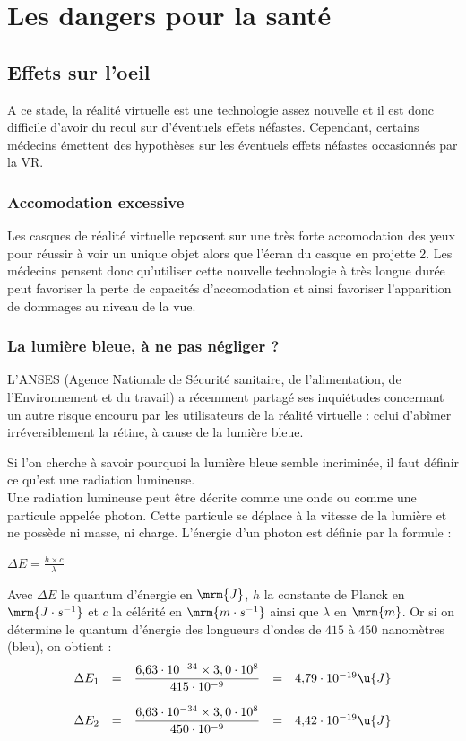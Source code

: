 \documentclass[12pt, a4paper]{report}
\begin{document}
\chapter[Dangers]{Les dangers pour la santé}

\section{Effets sur l'oeil}

A ce stade, la réalité virtuelle est une technologie assez nouvelle et il est donc difficile d'avoir du recul sur d'éventuels effets néfastes. Cependant, certains médecins émettent des hypothèses sur les éventuels effets néfastes occasionnés par la VR.

\subsection{Accomodation excessive} Les casques de réalité virtuelle reposent sur une très forte accomodation des yeux pour réussir à voir un unique objet alors que l'écran du casque en projette 2. Les médecins pensent donc qu'utiliser cette nouvelle technologie à très longue durée peut favoriser la perte de capacités d'accomodation et ainsi favoriser l'apparition de dommages au niveau de la vue.

\subsection{La lumière bleue, à ne pas négliger ?}

L'ANSES (Agence Nationale de Sécurité sanitaire, de l'alimentation, de l'Environnement et du travail) a récemment partagé ses inquiétudes concernant un autre risque encouru par les utilisateurs de la réalité virtuelle : celui d'abîmer irréversiblement la rétine, à cause de la lumière bleue.

Si l'on cherche à savoir pourquoi la lumière bleue semble incriminée, il faut définir ce qu'est une radiation lumineuse. \\ Une radiation lumineuse peut être décrite comme une onde ou comme une particule appelée photon. Cette particule se déplace à la vitesse de la lumière et ne possède ni masse, ni charge. L'énergie d'un photon est définie par la formule :
\begin{center}
 \Large{$\Delta E = \frac{h \times c}{\lambda}$}
\end{center}
 Avec $\Delta E$ le quantum d'énergie en $\mrm{J}$, $h$ la constante de Planck en $\mrm{J \cdot s^{-1}}$ et $c$ la célérité en $\mrm{m \cdot s^{-1}}$ ainsi que $\lambda$ en $\mrm{m}$. Or si on détermine le quantum d'énergie des longueurs d'ondes de $415$ à $450$ nanomètres (bleu), on obtient :
\[
\begin{array}{rcccl}
\Delta E_1 &=& \dfrac{6{,}63 \cdot 10^{-34} \times 3,0 \cdot 10^8}{415 \cdot 10^{-9}} &=& 4{,}79 \cdot 10^{-19}\u{J} \\

&&&&\\

\Delta E_2 &=& \dfrac{6{,}63 \cdot 10^{-34} \times 3,0 \cdot 10^8}{450 \cdot 10^{-9}} &=& 4{,}42 \cdot 10^{-19}\u{J}
\end{array}
\]
\end{document}
